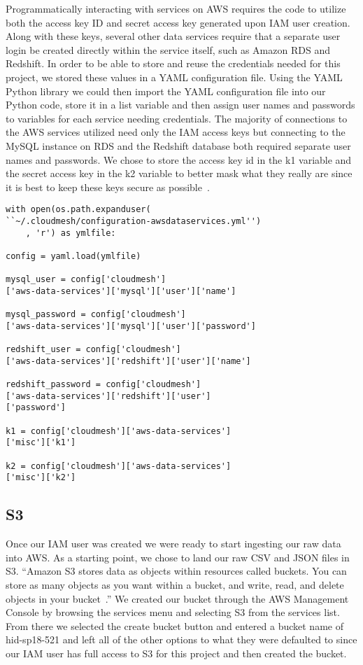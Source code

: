 Programmatically interacting with services on AWS requires the code to utilize 
both the access key ID and secret access key generated upon IAM user creation. 
Along with these keys, several other data services require that a separate 
user login be created directly within the service itself, such as Amazon RDS 
and Redshift. In order to be able to store and reuse the credentials needed 
for this project, we stored these values in a YAML configuration file. Using 
the YAML Python library we could then import the YAML configuration file into 
our Python code, store it in a list variable and then assign user names and 
passwords to variables for each service needing credentials. The majority of 
connections to the AWS services utilized need only the IAM access keys but 
connecting to the MySQL instance on RDS and the Redshift database both 
required separate user names and passwords. We chose to store the access key 
id in the k1 variable and the secret access key in the k2 variable to better 
mask what they really are since it is best to keep these keys secure as 
possible~\cite{hid-sp18-521-IAMkeys}. 

\begin{verbatim}
with open(os.path.expanduser(
``~/.cloudmesh/configuration-awsdataservices.yml'')
	, 'r') as ymlfile:

config = yaml.load(ymlfile)

mysql_user = config['cloudmesh']
['aws-data-services']['mysql']['user']['name']

mysql_password = config['cloudmesh']
['aws-data-services']['mysql']['user']['password']

redshift_user = config['cloudmesh']
['aws-data-services']['redshift']['user']['name']

redshift_password = config['cloudmesh']
['aws-data-services']['redshift']['user']
['password']

k1 = config['cloudmesh']['aws-data-services']
['misc']['k1']

k2 = config['cloudmesh']['aws-data-services']
['misc']['k2']
\end{verbatim}


\subsection{S3}

Once our IAM user was created we were ready to start ingesting our raw data 
into AWS. As a starting point, we chose to land our raw CSV and JSON files in 
S3. ``Amazon S3 stores data as objects within resources called buckets. You 
can store as many objects as you want within a bucket, and write, read, and 
delete objects in your bucket~\cite{hid-sp18-521-S3features}.'' We created our 
bucket through the AWS Management Console by browsing the services menu and 
selecting S3 from the services list. From there we selected the create bucket 
button and entered a bucket name of hid-sp18-521 and left all of the other 
options to what they were defaulted to since our IAM user has full access to 
S3 for this project and then created the bucket. 

